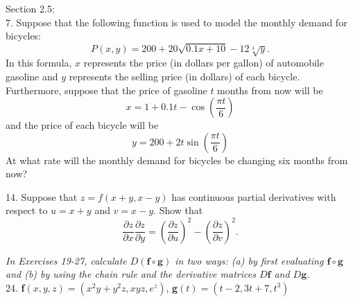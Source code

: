 \documentclass[12pt,letterpaper]{hmcpset}
\begin{document}
\begin{problem}
Section 2.5:\\
7. Suppose that the following function is used to model
the monthly demand for bicycles:
\begin{equation}
    P(x,y)=200+20\sqrt{0.1x+10}-12\sqrt[3]{y}.
\end{equation}
In this formula, $x$ represents the price (in dollars
per gallon) of automobile gasoline and $y$ represents the selling price (in dollars) of each bicycle.
Furthermore, suppose that the price of gasoline $t$ months from now will be
\begin{equation}
    x=1+0.1t-\cos\left(\frac{\pi t}{6}\right)
\end{equation}
and the price of each bicycle will be 
\begin{equation}
    y=200+2t\sin\left(\frac{\pi t}{6}\right)
\end{equation}
At what rate will the monthly demand for bicycles be changing six months from now?
\end{problem}
\newpage
\begin{problem}
14. Suppose that $z = f (x + y, x - y)$ has continuous partial derivatives with respect to $u = x + y$ and $v =x - y$. Show that
\begin{equation}
    \frac{\partial z}{\partial x}
    \frac{\partial z}{\partial y} = \left(\frac{\partial z}{\partial u}\right)^2-\left(\frac{\partial z}{\partial v}\right)^2.
\end{equation}

\end{problem}

\newpage

\begin{problem}
\textit{In Exercises 19-27, calculate $D(\mathbf{f} \circ \mathbf{g})$ in two ways: (a) by first evaluating $\mathbf{f} \circ \mathbf{g} $ and (b) by using the chain rule and the derivative matrices $D\textbf{f}$ and $D\textbf{g}$.}
\\
24. \textbf{f}$(x,y,z)=(x^2y + y^2z, xyz, e^z)$, \textbf{g}$(t) = (t - 2, 3t + 7, t^3 )$
\end{problem}

\newpage
\end{document}
